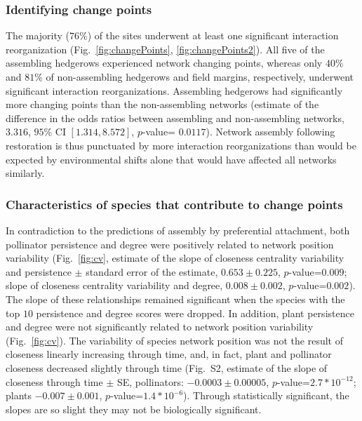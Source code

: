 \documentclass[12pt]{article}
\begin{document}
\subsubsection*{Identifying change points}

The majority ($76\%$) of the sites underwent at least one significant
interaction reorganization (Fig.~\ref{fig:changePoints},
\ref{fig:changePoints2}).  All five of the assembling hedgerows
experienced network changing points, whereas only $40\%$ and $81\%$ of
non-assembling hedgerows and field margins, respectively, underwent
significant interaction reorganizations. Assembling hedgerows had
significantly more changing points than the non-assembling networks
(estimate of the difference in the odds ratios between assembling and
non-assembling networks, $3.316$, $95\%$ CI $[1.314, 8.572]$,
$p$-value= $0.0117$). Network assembly following restoration is thus
punctuated by more interaction reorganizations than would be expected
by environmental shifts alone that would have affected all networks
similarly.

\subsubsection*{Characteristics of species that contribute to change
  points}

In contradiction to the predictions of assembly by preferential
attachment, both pollinator persistence and degree were positively
related to network position variability (Fig.~\ref{fig:cv}, estimate
of the slope of closeness centrality variability and persistence $\pm$
standard error of the estimate, $0.653 \pm 0.225$, $p$-value=$0.009$;
slope of closeness centrality variability and degree, $0.008 \pm
0.002$, $p$-value=$0.002$). The slope of these relationships remained
significant when the species with the top $10$ persistence and degree
scores were dropped. In addition, plant persistence and degree were
not significantly related to network position variability
(Fig.~\ref{fig:cv}). %
The variability of species network position was not the result of
closeness linearly increasing through time, and, in fact, plant and
pollinator closeness decreased slightly through time (Fig.~S2,
estimate of the slope of closeness through time $\pm$ SE, pollinators:
$-0.0003 \pm 0.00005$, $p$-value=$2.7*10^{-12}$; plants $-0.007 \pm
0.001$, $p$-value=$1.4*10^{-6}$). Through statistically significant,
the slopes are so slight they may not be biologically significant.
\end{document}
